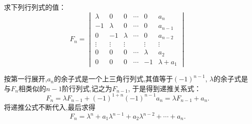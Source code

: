 \begin{example}
  求下列行列式的值：
  \begin{equation*}
    F_n =
    \begin{vmatrix}
      \lambda & 0 & 0 & \cdots & 0 & a_n\\
      -1 & \lambda & 0 & \cdots & 0 & a_{n-1}\\
      0 & -1 & \lambda & \cdots & 0 & a_{n-2}\\
      \vdots & \vdots & \vdots &  & \vdots & \vdots\\
      0 & 0 & 0 & \cdots & \lambda & a_2\\
      0 & 0 & 0 & \cdots & -1 & \lambda + a_1
    \end{vmatrix}
  \end{equation*}
\end{example}

\begin{solution}
  按第一行展开,$a_n$的余子式是一个上三角行列式,其值等于$(-1)^{n-1}$,
  $\lambda$的余子式是与$F_n$相类似的$n-1$阶行列式,记之为$F_{n-1}$,
  于是得到递推关系式：
  \begin{equation*}
    F_n = \lambda F_{n-1}+(-1)^{1+n}(-1)^{n-1}a_n= \lambda F_{n-1}+a_n.
  \end{equation*}
  将递推公式不断代入,最后求得
  \begin{equation*}
    F_n=\lambda^n+a_1\lambda^{n-1}+a_2\lambda^{n-2}+\cdots+a_n.
  \end{equation*}
\end{solution}

